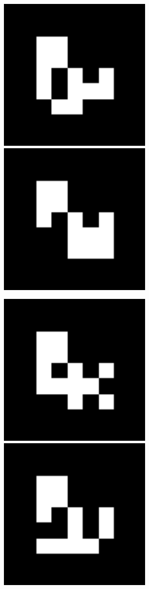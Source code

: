 \documentclass[10pt,letterpaper]{article}
\begin{document}
\includegraphics[width=3in]{MarkerData_149.png}
\includegraphics[width=3in]{MarkerData_150.png}


\includegraphics[width=3in]{MarkerData_151.png}
\includegraphics[width=3in]{MarkerData_152.png}
\end{document}
